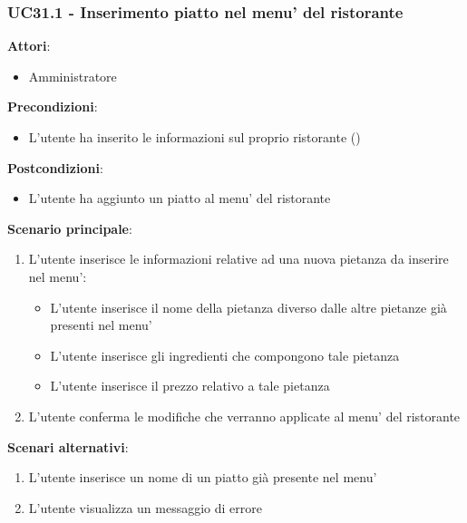 \subsubsection{UC31.1 - Inserimento piatto nel menu' del ristorante}\label{usecase:31_1}
\textbf{Attori}:
\begin{itemize}
    \item Amministratore
\end{itemize}
\textbf{Precondizioni}:
\begin{itemize}
    \item L'utente ha inserito le informazioni sul proprio ristorante ()
\end{itemize}
\textbf{Postcondizioni}:
\begin{itemize}
    \item L’utente ha aggiunto un piatto al menu’ del ristorante
\end{itemize}
\textbf{Scenario principale}:
\begin{enumerate}
    \item L'utente inserisce le informazioni relative ad una nuova pietanza da inserire nel menu':
    \begin{itemize}
        \item L'utente inserisce il nome della pietanza diverso dalle altre pietanze già presenti nel menu'
        \item L'utente inserisce gli ingredienti che compongono tale pietanza
        \item L'utente inserisce il prezzo relativo a tale pietanza
    \end{itemize}
    \item L'utente conferma le modifiche che verranno applicate al menu' del ristorante
\end{enumerate}
\textbf{Scenari alternativi}: 
\begin{enumerate}
    \item L'utente inserisce un nome di un piatto già presente nel menu'
    \item L'utente visualizza un messaggio di errore
\end{enumerate}